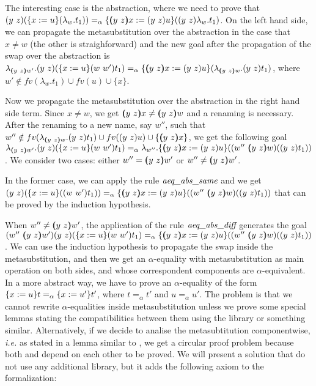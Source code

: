 The interesting case is the abstraction, where we need to prove that $\swap{y}{z}{(\metasub{(\lambda_w.t_1)}{x}{u})} =_\alpha \metasub{(\swap{y}{z}{\lambda_w.t_1})}{\vswap{y}{z}{x}}{\swap{y}{z}{u}}$. On the left hand side, we can propagate the metasubstitution over the abstraction in the case that $x \neq w$ (the other is straighforward) and the new goal after the propagation of the swap over the abstraction is $\lambda_{\vswap{y}{z}{w'}}.\swap{y}{z}{(\metasub{\swap{w}{w'}{t_1}}{x}{u})} =_\alpha \metasub{(\lambda_{\vswap{y}{z}{w}}.\swap{y}{z}{t_1})}{\vswap{y}{z}{x}}{\swap{y}{z}{u}}$, where $w' \notin fv(\lambda_w.t_1) \cup fv(u) \cup \{x\}$.
\begin{coqdoccode}
\end{coqdoccode}
Now we propagate the metasubstitution over the abstraction in the right hand side term. Since $x\neq w$, we get $\vswap{y}{z}{x} \neq \vswap{y}{z}{w}$ and a renaming is necessary. After the renaming to a new name, say $w''$, such that $w'' \notin fv(\lambda_{\vswap{y}{z}{w}}.\swap{y}{z}{t_1}) \cup fv(\swap{y}{z}{u}) \cup \{\vswap{y}{z}{x}\}$, we get the following goal $\lambda_{\vswap{y}{z}{w'}}.\swap{y}{z}{(\metasub{\swap{w}{w'}{t_1}}{x}{u})} =_\alpha \lambda_{w''}.\metasub{(\swap{w''}{\vswap{y}{z}{w}}{(\swap{y}{z}{t_1})})}{\vswap{y}{z}{x}}{\swap{y}{z}{u}}$. We consider two cases: either $w'' = \vswap{y}{z}{w'}$ or $w'' \neq \vswap{y}{z}{w'}$.
\begin{coqdoccode}
\end{coqdoccode}
In the former case, we can apply the rule $\mbox{\it aeq}\_\mbox{\it abs}\_\mbox{\it same}$ and we get $\swap{y}{z}{(\metasub{(\swap{w}{w'}{t_1})}{x}{u})} =_\alpha \metasub{(\swap{w''}{\vswap{y}{z}{w}}{(\swap{y}{z}{t_1})})}{\vswap{y}{z}{x}}{\swap{y}{z}{u}}$ that can be proved by the induction hypothesis.
\begin{coqdoccode}
\end{coqdoccode}
When $w'' \neq \vswap{y}{z}{w'}$, the application of the rule $\mbox{\it aeq}\_\mbox{\it abs}\_\mbox{\it diff}$ generates the goal $\swap{w''}{\vswap{y}{z}{w'}}{\swap{y}{z}{(\metasub{\swap{w}{w'}{t_1}}{x}{u})}} =_\alpha \metasub{(\swap{w''}{\vswap{y}{z}{w}}{(\swap{y}{z}{t_1})})}{\vswap{y}{z}{x}}{\swap{y}{z}{u}}$. We can use the induction hypothesis to propagate the swap inside the metasubstitution, and then we get an $\alpha$-equality with metasubstitution as main operation on both sides, and whose correspondent components are $\alpha$-equivalent. In a more abstract way, we have to prove an $\alpha$-equality of the form $\metasub{t}{x}{u} =_\alpha \metasub{t'}{x}{u'}$, where $t =_\alpha t'$ and $u =_\alpha u'$. The problem is that we cannot rewrite $\alpha$-equalities inside metasubstitution unless we prove some special lemmas stating the compatibilities between them using the  library or something similar. Alternatively, if we decide to analise the metasubtitution componentwise, {\it i.e.} as stated in a lemma similar to , we get a circular proof problem because both  and  depend on each other to be proved. We will present a solution that do not use any additional library, but it adds the following axiom to the formalization:

